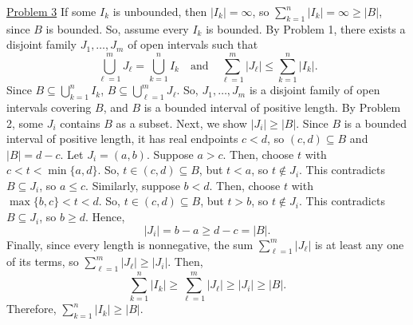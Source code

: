 \documentclass{exam}
\begin{document}
\underline{Problem 3}
\newline
\newline
If some $I_k$ is unbounded, then $|I_k|=\infty$, so $\sum_{k=1}^{n}|I_k|=\infty\geq|B|$, since $B$ is bounded. So, assume every $I_k$ is bounded.
\newline
\newline
By Problem 1, there exists a disjoint family $J_1,\ldots,J_m$ of open intervals such that
\[
    \bigcup_{\ell=1}^{m}J_\ell=\bigcup_{k=1}^{n}I_k\quad\text{and}\quad\sum_{\ell=1}^{m}|J_\ell|\leq\sum_{k=1}^{n}|I_k|.
\]
Since $B\subseteq\bigcup_{k=1}^{n}I_k$, $B\subseteq\bigcup_{\ell=1}^{m}J_\ell$. So, $J_1,\ldots,J_m$ is a disjoint family of open intervals covering $B$, and $B$ is a bounded interval of positive length. By Problem 2, some $J_i$ contains $B$ as a subset.
\newline
\newline
Next, we show $|J_i|\geq|B|$. Since $B$ is a bounded interval of positive length, it has real endpoints $c<d$, so $(c,d)\subseteq B$ and $|B|=d-c$. Let $J_i=(a,b)$. Suppose $a>c$. Then, choose $t$ with $c<t<\min\{a,d\}$. So, $t\in(c,d)\subseteq B$, but $t<a$, so $t\notin J_i$. This contradicts $B\subseteq J_i$, so $a\leq c$. Similarly, suppose $b<d$. Then, choose $t$ with $\max\{b,c\}<t<d$. So, $t\in(c,d)\subseteq B$, but $t>b$, so $t\notin J_i$. This contradicts $B\subseteq J_i$, so $b\geq d$. Hence,
\[
    |J_i|=b-a\geq d-c=|B|.
\]
Finally, since every length is nonnegative, the sum $\sum_{\ell=1}^{m}|J_\ell|$ is at least any one of its terms, so $\sum_{\ell=1}^{m}|J_\ell|\geq|J_i|$. Then,
\[
    \sum_{k=1}^{n}|I_k|\geq\sum_{\ell=1}^{m}|J_\ell|\geq|J_i|\geq|B|.
\]
Therefore, $\sum_{k=1}^{n}|I_k|\geq|B|$.
\newline
\end{document}
